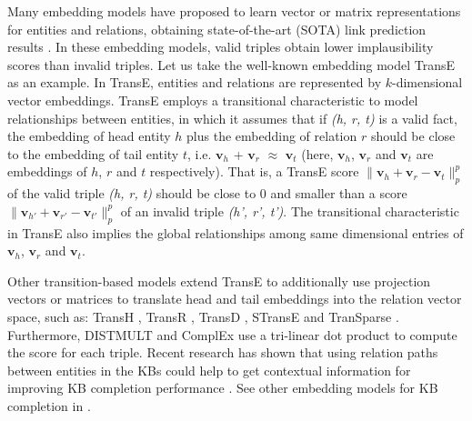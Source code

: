 \documentclass[11pt,a4paper]{article}
\begin{document}
Many embedding models have proposed to learn vector or matrix representations for entities and relations, obtaining state-of-the-art (SOTA) link prediction results \cite{NickelMTG15}. In these embedding models, valid triples obtain lower implausibility scores than invalid triples.
Let us take the well-known embedding model TransE \citep{NIPS2013_5071} as an example. In TransE,  entities and relations are represented by $k$-dimensional vector embeddings.  
TransE employs a transitional characteristic to model relationships between entities, in which it assumes that  if \textit{(h, r, t)} is a valid fact, the embedding of head entity $h$ plus the embedding of relation $r$ should be close to the embedding of tail entity $t$, i.e. $\boldsymbol{v}_h$ + $\boldsymbol{v}_r$ $\approx$ $\boldsymbol{v}_t$
 (here, $\boldsymbol{v}_h$, $\boldsymbol{v}_r$ and $\boldsymbol{v}_t$ are embeddings of $h$, $r$ and $t$ respectively). That is, a TransE score $\|\boldsymbol{v}_h + \boldsymbol{v}_r - \boldsymbol{v}_t\|_p^p$ of the valid  triple \textit{(h, r, t)}  should be close to  $0$ and  smaller than a score $\|\boldsymbol{v}_{h'} + \boldsymbol{v}_{r'} - \boldsymbol{v}_{t'}\|_p^p$ of an invalid  triple \textit{(h', r', t')}. 
The  transitional characteristic in TransE  also implies the global relationships among same dimensional entries of $\boldsymbol{v}_h$, $\boldsymbol{v}_r$ and $\boldsymbol{v}_t$.

Other  transition-based models extend TransE 
to additionally use projection vectors or matrices to translate head and tail embeddings into the relation vector space,  such as: TransH \citep{AAAI148531}, TransR \citep{AAAI159571}, TransD \citep{ji-EtAl:2015:ACL-IJCNLP}, STransE \citep{NguyenNAACL2016}  and TranSparse \citep{JiLH016}. 
Furthermore, DISTMULT \citep{Yang2015} and ComplEx \citep{Trouillon2016} use a tri-linear dot product to compute the score for each triple.  
Recent research has shown that using relation paths between entities in the KBs could help to get contextual information for improving  KB completion performance \citep{lin-EtAl:2015:EMNLP1,luo-EtAl:2015:EMNLP3,guu2015traversing,Toutanova2016,Nguyen2016}.  See other embedding models for KB completion in \citet{Nguyen2017}.
\end{document}

